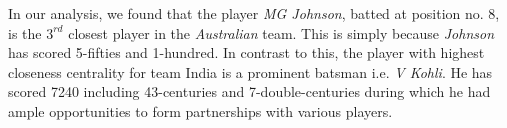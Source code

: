 \documentclass{article}
\begin{document}
In our analysis, we found that the player \textit{MG Johnson}, batted at position no. 8, is the $3^{rd}$ closest player in the \textit{Australian} team. This is simply because \textit{Johnson} has scored 5-fifties and 1-hundred. In contrast to this, the player with highest closeness centrality for team India is a  prominent batsman i.e. \textit{V Kohli}. He has scored 7240 including 43-centuries and 7-double-centuries during which he had ample opportunities to form partnerships with various players.

\begin{table}[!h]
\end{table}
\end{document}
